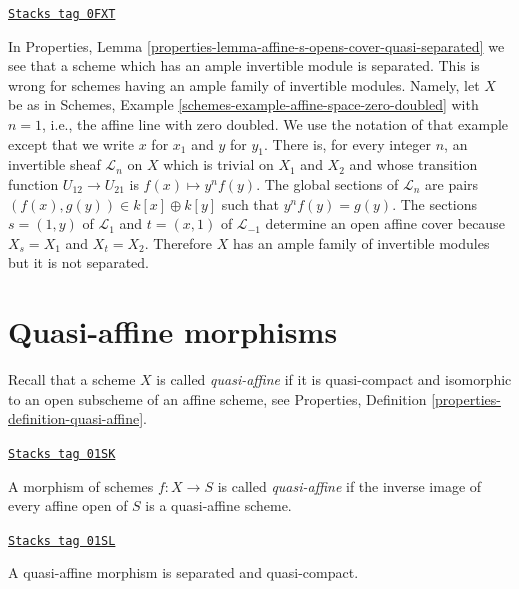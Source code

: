\begin{remark}
\label{morphisms-remark-affine-s-opens-cover-family}
\href{https://stacks.math.columbia.edu/tag/0FXT}{\texttt{Stacks tag 0FXT}}

In Properties, Lemma \ref{properties-lemma-affine-s-opens-cover-quasi-separated}
we see that a scheme which has an ample invertible module
is separated. This is wrong for schemes having an ample
family of invertible modules. Namely, let $X$ be as in
Schemes, Example \ref{schemes-example-affine-space-zero-doubled}
with $n = 1$, i.e., the affine line with zero doubled.  We use the notation
of that example except that we write $x$ for $x_1$ and $y$
for $y_1$.  There is, for every integer $n$, an invertible
sheaf $\mathcal{L}_n$ on $X$ which is trivial on $X_1$ and
$X_2$ and whose transition function $U_{12} \to U_{21}$ is
$f(x) \mapsto y^n f(y)$.  The global sections of
$\mathcal{L}_n$ are pairs $(f(x), g(y)) \in k[x] \oplus
k[y]$ such that $y^n f(y) = g(y)$.  The sections $s = (1,
y)$ of $\mathcal{L}_1$ and $t = (x, 1)$ of
$\mathcal{L}_{-1}$ determine an open affine cover because
$X_s = X_1$ and $X_t = X_2$.  Therefore $X$ has an
ample family of invertible modules but it is not separated.
\end{remark}

\section{Quasi-affine morphisms}
\label{morphisms-section-quasi-affine}
Recall that a scheme $X$ is called {\it quasi-affine} if it is quasi-compact
and isomorphic to an open subscheme of an affine scheme, see
Properties, Definition \ref{properties-definition-quasi-affine}.

\begin{definition}
\label{morphisms-definition-quasi-affine}
\href{https://stacks.math.columbia.edu/tag/01SK}{\texttt{Stacks tag 01SK}}

A morphism of schemes $f : X \to S$ is called {\it quasi-affine} if the
inverse image of every affine open of $S$ is a quasi-affine scheme.
\end{definition}

\begin{lemma}
\label{morphisms-lemma-quasi-affine-separated}
\href{https://stacks.math.columbia.edu/tag/01SL}{\texttt{Stacks tag 01SL}}

A quasi-affine morphism is separated and quasi-compact.
\end{lemma}

